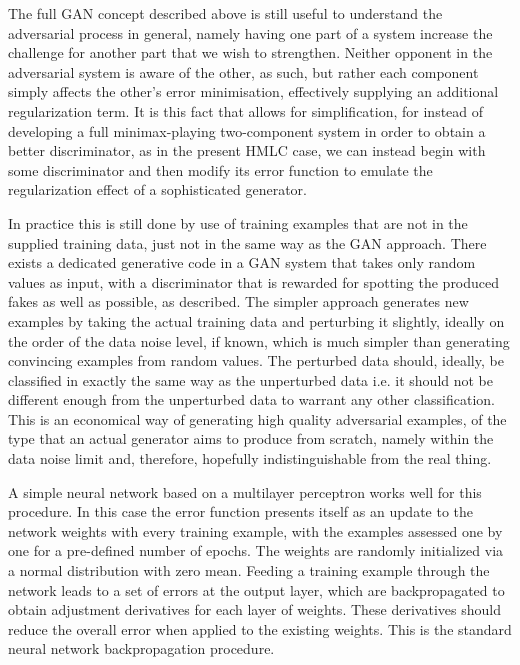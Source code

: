 \documentclass{article} %
\begin{document}
The full GAN concept described above is still useful to understand the adversarial process in general, namely having one part of a system increase the challenge for another part that we wish to strengthen. Neither opponent in the adversarial system is aware of the other, as such, but rather each component simply affects the other's error minimisation, effectively supplying an additional regularization term. It is this fact that allows for simplification, for instead of developing a full minimax-playing two-component system in order to obtain a better discriminator, as in the present HMLC case, we can instead begin with some discriminator and then modify its error function to emulate the regularization effect of a sophisticated generator.

In practice this is still done by use of training examples that are not in the supplied training data, just not in the same way as the GAN approach. There exists a dedicated generative code in a GAN system that takes only random values as input, with a discriminator that is rewarded for spotting the produced fakes as well as possible, as described. The simpler approach generates new examples by taking the actual training data and perturbing it slightly, ideally on the order of the data noise level, if known, which is much simpler than generating convincing examples from random values. The perturbed data should, ideally, be classified in exactly the same way as the unperturbed data i.e. it should not be different enough from the unperturbed data to warrant any other classification. This is an economical way of generating high quality adversarial examples, of the type that an actual generator aims to produce from scratch, namely within the data noise limit and, therefore, hopefully indistinguishable from the real thing.

A simple neural network based on a multilayer perceptron works well for this procedure. In this case the error function presents itself as an update to the network weights with every training example, with the examples assessed one by one for a pre-defined number of epochs. The weights are randomly initialized via a normal distribution with zero mean. Feeding a training example through the network leads to a set of errors at the output layer, which are backpropagated to obtain adjustment derivatives for each layer of weights. These derivatives should reduce the overall error when applied to the existing weights. This is the standard neural network backpropagation procedure.
\end{document}
